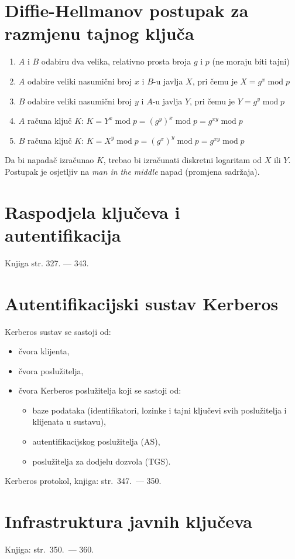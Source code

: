 \documentclass[11pt]{article}
\begin{document}
\section{Diffie-Hellmanov postupak za razmjenu tajnog ključa}
\begin{enumerate}
  \item $A$ i $B$ odabiru dva velika, relativno prosta broja $g$ i $p$ (ne moraju biti tajni)
  \item $A$ odabire veliki nasumični broj $x$ i $B$-u javlja $X$, pri čemu je $X = g^x \;\text{mod}\;  p$
  \item $B$ odabire veliki nasumični broj $y$ i $A$-u javlja $Y$, pri čemu je $Y = g^y \;\text{mod}\; p$
  \item $A$ računa ključ $K$: $K = Y^x \;\text{mod}\; p = (g^y)^x \;\text{mod}\; p = g^{xy} \;\text{mod}\; p$
  \item $B$ računa ključ $K$: $K = X^y \;\text{mod}\;  p = (g^x)^y \;\text{mod}\;  p = g^{xy} \;\text{mod}\; p$
\end{enumerate}
Da bi napadač izračunao $K$, trebao bi izračunati diskretni logaritam od $X$ ili $Y$.\\
Postupak je osjetljiv na \emph{man in the middle} napad (promjena sadržaja).

\section{Raspodjela ključeva i autentifikacija}
Knjiga str. 327. --- 343.

\section{Autentifikacijski sustav Kerberos}
Kerberos sustav se sastoji od:
\begin{itemize}
	\item čvora klijenta,
	\item čvora poslužitelja,
	\item čvora Kerberos poslužitelja koji se sastoji od:
\begin{itemize}
		\item baze podataka (identifikatori, lozinke i tajni ključevi svih poslužitelja i klijenata u sustavu),
		\item autentifikacijskog poslužitelja (AS),
		\item poslužitelja za dodjelu dozvola (TGS).
\end{itemize}
\end{itemize}
Kerberos protokol, knjiga: str.\ 347.\ --- 350.

\section{Infrastruktura javnih ključeva}
Knjiga: str.\ 350.\ --- 360.
\end{document}

